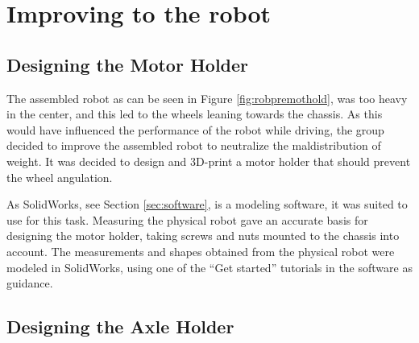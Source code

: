 \section{Improving to the robot}
\label{sec:improvements}

\subsection{Designing the Motor Holder}
The assembled robot as can be seen in Figure \ref{fig:robpremothold}, was too heavy in the center, and this led to the wheels leaning towards the chassis. As this would have influenced the performance of the robot while driving, the group decided to improve the assembled robot to neutralize the maldistribution of weight. It was decided to design and 3D-print a motor holder that should prevent the wheel angulation.

As SolidWorks, see Section \ref{sec:software}, is a modeling software, it was suited to use for this task. Measuring the physical robot gave an accurate basis for designing the motor holder, taking screws and nuts mounted to the chassis into account. The measurements and shapes obtained from the physical robot were modeled in SolidWorks, using one of the ``Get started'' tutorials in the software as guidance.



\subsection{Designing the Axle Holder}


